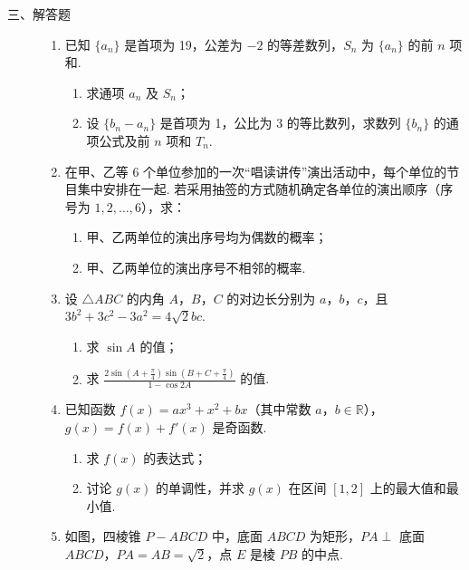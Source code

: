 \begin{description}

    \item[三、解答题]

    \begin{enumerate}[leftmargin=5pt]

      \addtocounter{enumi}{+15}

        \item 已知 \(\{a_n\}\) 是首项为 19，公差为 \(-2\) 的等差数列，\(S_n\) 为 \(\{a_n\}\) 的前 \(n\) 项和.
\begin{enumerate}
\item 求通项 \( a_{n} \) 及 \( S_{n} \)；
\item 设 \( \{b_{n}-a_{n}\} \) 是首项为 1，公比为 3 的等比数列，求数列 \( \{b_{n}\} \) 的通项公式及前 \(n\) 项和 \( T_{n} \).
\end{enumerate}

        \item 在甲、乙等 6 个单位参加的一次“唱读讲传”演出活动中，每个单位的节目集中安排在一起. 若采用抽签的方式随机确定各单位的演出顺序（序号为 \(1,2,\ldots,6\)），求：
\begin{enumerate}
\item 甲、乙两单位的演出序号均为偶数的概率；
\item 甲、乙两单位的演出序号不相邻的概率.
\end{enumerate}

        \item 设 \(\triangle ABC\) 的内角 \(A\)，\(B\)，\(C\) 的对边长分别为 \(a\)，\(b\)，\(c\)，且 \(3b^{2} + 3c^{2} - 3a^{2} = 4\sqrt{2}bc\).
\begin{enumerate}
\item 求 \(\sin A\) 的值；
\item 求 \(\frac{2\sin\left(A + \frac{\pi}{4}\right)\sin\left(B + C + \frac{\pi}{4}\right)}{1 - \cos 2A}\) 的值.
\end{enumerate}

        \item 已知函数 \( f(x) = ax^3 + x^2 + bx \)（其中常数 \(a\)，\(b \in \mathbb{R}\)），\( g(x) = f(x) + f'(x) \) 是奇函数.
\begin{enumerate}
\item 求 \( f(x) \) 的表达式；
\item 讨论 \( g(x) \) 的单调性，并求 \( g(x) \) 在区间 \( [1,2] \) 上的最大值和最小值.
\end{enumerate}

        \item 如图，四棱锥 \(P - ABCD\) 中，底面 \(ABCD\) 为矩形，\(PA \perp\) 底面 \(ABCD\)，\(PA = AB = \sqrt{2}\)，点 \(E\) 是棱 \(PB\) 的中点.


\end{enumerate}
\end{description}
